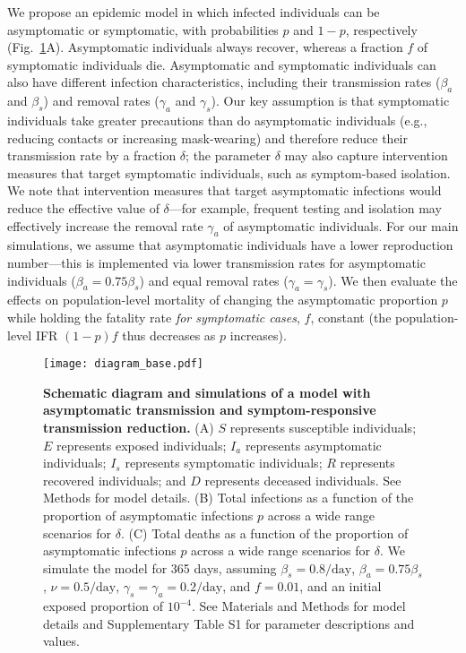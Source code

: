 \documentclass[12pt]{article}
\newcommand{\fref}[1]{Fig.~\ref{fig:#1}}
\begin{document}
We propose an epidemic model in which infected individuals can be asymptomatic or symptomatic, with probabilities $p$ and $1-p$, respectively (\fref{base}A).  
Asymptomatic individuals always recover, whereas a fraction $f$ of symptomatic individuals die.
Asymptomatic and symptomatic individuals can also have different infection characteristics, including their transmission rates ($\beta_a$ and $\beta_s$) and removal rates ($\gamma_a$ and $\gamma_s$).
Our key assumption is that symptomatic individuals take greater precautions than do asymptomatic individuals (e.g., reducing contacts or increasing mask-wearing) and therefore reduce their transmission rate by a fraction $\delta$;
the parameter $\delta$ may also capture intervention measures that target symptomatic individuals, such as symptom-based isolation. 
We note that intervention measures that target asymptomatic infections would reduce the effective value of $\delta$---for example, frequent testing and isolation may effectively increase the removal rate $\gamma_a$ of asymptomatic individuals.
For our main simulations, we assume that asymptomatic individuals have a lower reproduction number---this is implemented via lower transmission rates for asymptomatic individuals ($\beta_a = 0.75 \beta_s$) and equal removal rates ($\gamma_a = \gamma_s$).
We then evaluate the effects on population-level mortality of changing the asymptomatic proportion $p$ while holding the fatality rate \emph{for symptomatic cases}, $f$, constant (the population-level IFR $(1-p)f$ thus decreases as $p$ increases).
\begin{figure}[!ht]
\texttt{[image: diagram\_base.pdf]}
\caption{
\textbf{Schematic diagram and simulations of a model with asymptomatic transmission and symptom-responsive transmission reduction.}
(A) $S$ represents susceptible individuals; $E$ represents exposed individuals; $I_a$ represents asymptomatic individuals; $I_s$ represents symptomatic individuals; $R$ represents recovered individuals; and $D$ represents deceased individuals. See Methods for model details.
(B) Total infections as a function of the proportion of asymptomatic infections $p$ across a wide range scenarios for $\delta$.
(C) Total deaths as a function of the proportion of asymptomatic infections $p$ across a wide range scenarios for $\delta$.
We simulate the model for 365 days, assuming $\beta_s = 0.8/\mathrm{day}$, $\beta_a = 0.75 \beta_s$, $\nu=0.5/\mathrm{day}$, $\gamma_s=\gamma_a=0.2/\mathrm{day}$, and $f=0.01$, and an initial exposed proportion of $10^{-4}$.
See Materials and Methods for model details and Supplementary Table S1 for parameter descriptions and values.
}
\label{fig:base}
\end{figure}
\end{document}
